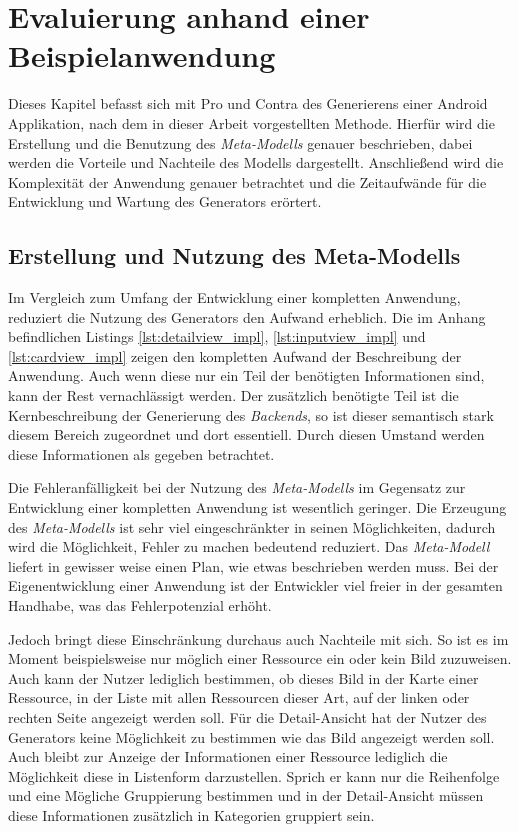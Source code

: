 \chapter{Evaluierung anhand einer Beispielanwendung}
Dieses Kapitel befasst sich mit Pro und Contra des Generierens einer Android Applikation, nach dem in dieser Arbeit vorgestellten Methode.
Hierfür wird die Erstellung und die Benutzung des \textit{Meta-Modells} genauer beschrieben, dabei werden die Vorteile und Nachteile des Modells dargestellt. Anschließend wird die Komplexität der Anwendung genauer betrachtet und die Zeitaufwände für die Entwicklung und Wartung des Generators erörtert.

\section{Erstellung und Nutzung des Meta-Modells}

Im Vergleich zum Umfang der Entwicklung einer kompletten Anwendung, reduziert die Nutzung des Generators den Aufwand erheblich. Die im Anhang befindlichen Listings \ref{lst:detailview_impl}, \ref{lst:inputview_impl} und \ref{lst:cardview_impl} zeigen den kompletten Aufwand der Beschreibung der Anwendung. Auch wenn diese nur ein Teil der benötigten Informationen sind, kann der Rest vernachlässigt werden. Der zusätzlich benötigte Teil ist die Kernbeschreibung der Generierung des \textit{Backends}, so ist dieser semantisch stark diesem Bereich zugeordnet und dort essentiell. Durch diesen Umstand werden diese Informationen als gegeben betrachtet.

Die Fehleranfälligkeit bei der Nutzung des \textit{Meta-Modells} im Gegensatz zur Entwicklung einer kompletten Anwendung ist wesentlich geringer. Die Erzeugung des \textit{Meta-Modells} ist sehr viel eingeschränkter in seinen Möglichkeiten, dadurch wird die Möglichkeit, Fehler zu machen bedeutend reduziert. Das \textit{Meta-Modell} liefert in gewisser weise einen Plan, wie etwas beschrieben werden muss. Bei der Eigenentwicklung einer Anwendung ist der Entwickler viel freier in der gesamten Handhabe, was das Fehlerpotenzial erhöht.

Jedoch bringt diese Einschränkung durchaus auch Nachteile mit sich. So ist es im Moment beispielsweise nur möglich einer Ressource ein oder kein Bild zuzuweisen. Auch kann der Nutzer lediglich bestimmen, ob dieses Bild in der Karte einer Ressource, in der Liste mit allen Ressourcen dieser Art, auf der linken oder rechten Seite angezeigt werden soll. Für die Detail-Ansicht hat der Nutzer des Generators keine Möglichkeit zu bestimmen wie das Bild angezeigt werden soll.
Auch bleibt zur Anzeige der Informationen einer Ressource lediglich die Möglichkeit diese in Listenform darzustellen. Sprich er kann nur die Reihenfolge und eine Mögliche Gruppierung bestimmen und in der Detail-Ansicht müssen diese Informationen zusätzlich in Kategorien gruppiert sein. 

